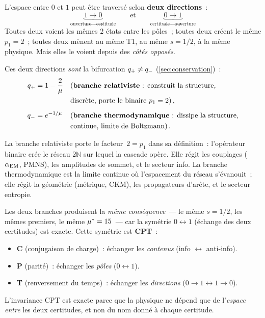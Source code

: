 \documentclass[12pt,a4paper]{article}
\begin{document}
\begin{remarque}
\label{rem:two_directions}
L'espace entre $0$ et $1$ peut être traversé selon
\textbf{deux directions}~:
\[
  \underbrace{1 \to 0}_{\text{ouverture} \to \text{certitude}}
  \qquad\text{et}\qquad
  \underbrace{0 \to 1}_{\text{certitude} \to \text{ouverture}}
\]
Toutes deux voient les mêmes $2$ états entre les pôles~; toutes deux
créent le même $p_1 = 2$~; toutes deux mènent au même T1, au même
$s = 1/2$, à la même physique. Mais elles le voient depuis des
\emph{côtés opposés}.

Ces deux directions \emph{sont} la bifurcation
$q_{+} \neq q_{-}$ (\cref{sec:conservation})~:
\begin{align}
  q_{+} &= 1 - \frac{2}{\mu}
  &&\text{(\textbf{branche relativiste}~: construit la structure,}
  \notag\\
  &&&\text{discrète, porte le binaire $p_1 = 2$)}\,, \label{eq:q_rel} \\[4pt]
  q_{-} &= e^{-1/\mu}
  &&\text{(\textbf{branche thermodynamique}~: dissipe la structure,}
  \notag\\
  &&&\text{continue, limite de Boltzmann)}\,. \label{eq:q_therm}
\end{align}

La branche relativiste porte le facteur~$2 = p_1$ dans sa définition~:
l'opérateur binaire crée le réseau $2\mathbb{N}$ sur lequel la cascade
opère. Elle régit les couplages ($\alpha_{\mathrm{EM}}$, PMNS), les amplitudes de
sommet, et le secteur info. La branche thermodynamique est la limite
continue où l'espacement du réseau s'évanouit~; elle régit la
géométrie (métrique, CKM), les propagateurs d'arête, et le secteur
entropie.

Les deux branches produisent la \emph{même conséquence}~--- le même
$s = 1/2$, les mêmes premiers, le même ${\mu^{*}} = 15$~--- car la
symétrie $0 \leftrightarrow 1$ (échange des deux certitudes) est
exacte. Cette symétrie est \textbf{CPT}~:
\begin{itemize}[nosep]
\item \textbf{C} (conjugaison de charge)~: échanger les
  \emph{contenus} (info $\leftrightarrow$ anti-info).
\item \textbf{P} (parité)~: échanger les \emph{pôles}
  ($0 \leftrightarrow 1$).
\item \textbf{T} (renversement du temps)~: échanger les
  \emph{directions} ($0{\to}1 \leftrightarrow 1{\to}0$).
\end{itemize}
L'invariance CPT est exacte parce que la physique ne dépend que de
l'\emph{espace entre} les deux certitudes, et non du nom donné à
chaque certitude.


\end{remarque}
\end{document}
